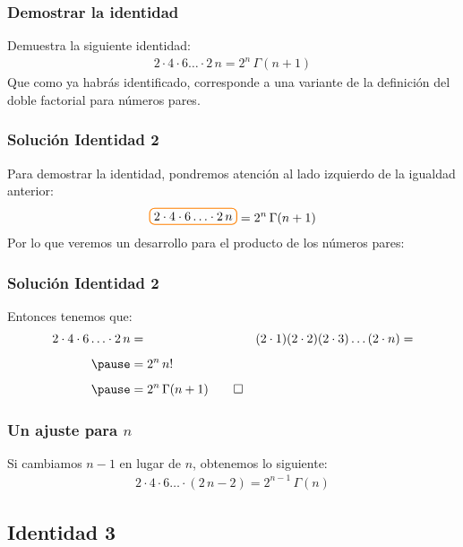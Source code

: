 \documentclass[12pt]{beamer}
\begin{document}
\begin{frame}
\frametitle{Demostrar la identidad}
Demuestra la siguiente identidad:
\pause
\begin{align*}
2 \cdot 4 \cdot 6 \ldots \cdot 2 \, n = 2^{n} \, \Gamma (n + 1)
\end{align*}
\pause
Que como ya habrás identificado, corresponde a una variante de la definición del doble factorial para números pares.
\end{frame}
\begin{frame}[t]
\frametitle{Solución Identidad 2}
Para demostrar la identidad, pondremos atención al lado izquierdo de la igualdad anterior:
\pause
\begin{align*}
\boxedcolor{2 \cdot 4 \cdot 6 \ldots \cdot 2 \, n } = 2^{n} \, \Gamma (n + 1)
\end{align*}
\pause
Por lo que veremos un desarrollo para el producto de los números pares:
\end{frame}
\begin{frame}
\frametitle{Solución Identidad 2}
Entonces tenemos que:
\pause
\begin{eqnarray}
\begin{aligned}
2 \cdot 4 \cdot 6 \ldots \cdot 2 \, n  &=& (2 \cdot 1) (2 \cdot 2) (2 \cdot 3) \ldots (2 \cdot n) = \nonumber \\[0.5em] \pause
&= 2^{n} \, n! \nonumber \\[0.5em] \pause
&= 2^{n} \, \Gamma (n + 1) \qed 
\end{aligned}
\label{eq:ecuacion_01_16}
\end{eqnarray}
\end{frame}
\begin{frame}
\frametitle{Un ajuste para $n$}
Si cambiamos $n - 1$ en lugar de $n$, obtenemos lo siguiente:
\pause
\begin{align*}
2 \cdot 4 \cdot 6 \ldots \cdot (2 \, n - 2)  = 2^{n-1} \, \Gamma (n)
\end{align*}
\end{frame}

\subsection{Identidad 3}
\end{document}
